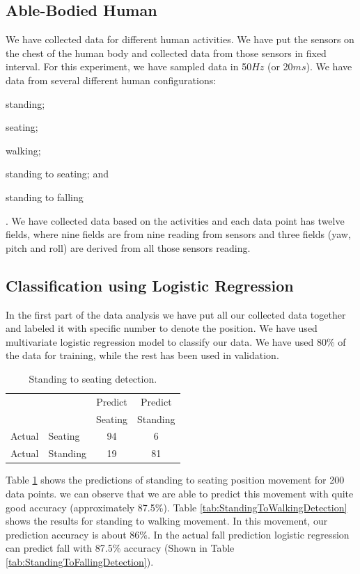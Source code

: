 \documentclass[letterpaper]{article}
\begin{document}
\subsection{Able-Bodied Human}

We have collected data for different human activities. We have put the sensors on the chest of the
human body and collected data from those sensors in fixed interval. For this experiment, we have
sampled data in 50$Hz$ (or 20$ms$). We have data from several different human configurations:
\begin{inparaenum}[(1)] \item standing; \item seating; \item walking; \item standing to seating;
and \item standing to falling\end{inparaenum}. We have collected data based on the activities and
each data point has twelve fields, where nine fields are from nine reading from sensors and three
fields (yaw, pitch and roll) are derived from all those sensors reading.

\subsection*{Classification using Logistic Regression}

In the first part of the data analysis we have put all our collected data together and labeled it
with specific number to denote the position. We have used multivariate logistic regression model to
classify our data. We have used 80\% of the data for training, while the rest has been used
in validation.

\begin{table}[!ht]
	\caption{Standing to seating detection.}	
	\label{tab:StandingToSeatingDetection}
	\centering
		\begin{tabular} {l l |c |c}
			& & Predict& Predict \\ 
			& & Seating & Standing \\ \hline
			Actual& Seating & 94 & 6\\ \hline
			Actual& Standing & 19& 81\\ \hline
		\end{tabular}
\end{table}

Table \ref{tab:StandingToSeatingDetection} shows the predictions of standing to seating position
movement for 200 data points. we can observe that we are able
to predict this movement with quite good accuracy (approximately 87.5\%). Table
 \ref{tab:StandingToWalkingDetection} shows the results for  standing to walking movement. In this
movement, our prediction accuracy is about 86\%. In the actual fall prediction logistic
regression can predict fall with 87.5\% accuracy (Shown in Table
 \ref{tab:StandingToFallingDetection}).
\end{document}
